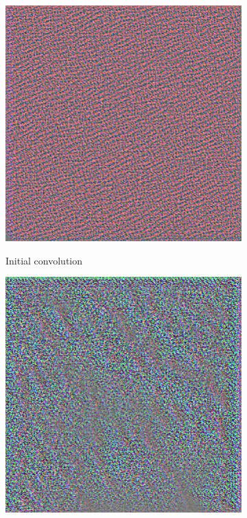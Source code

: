 \documentclass{kththesis}
\begin{document}
\begin{figure}
  \begin{subfigure}{.5\textwidth}
    \centering
    \includegraphics[width=0.9\linewidth]{img/layer0.png}
    \label{fig:layer0}
    \caption{Initial convolution}
  \end{subfigure}%
  \begin{subfigure}{.5\textwidth}
    \centering
    \includegraphics[width=0.9\linewidth]{img/layer1.png}

\end{subfigure}
\end{figure}
\end{document}
